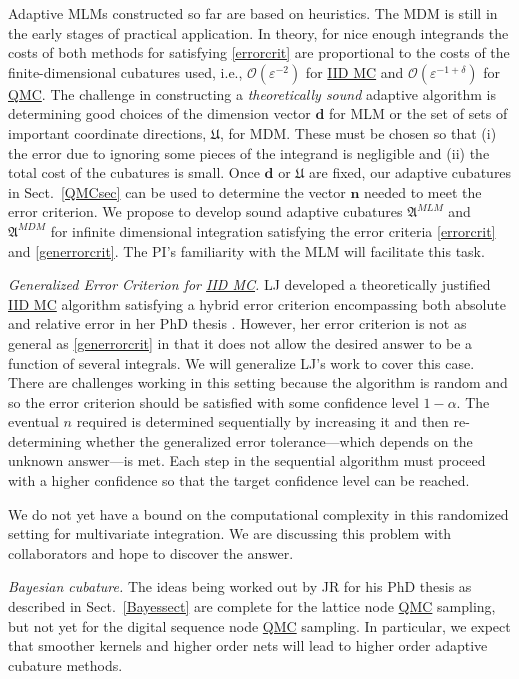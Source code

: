 \documentclass[11pt]{NSFamsart}
\newcommand{\QMC}{\hyperlink{QMClink}{QMC}\xspace}
\newcommand{\IIDMC}{\hyperlink{IIDMClink}{IID MC}\xspace}
\newcommand{\bd}{{\boldsymbol{d}}}
\newcommand{\bn}{{\boldsymbol{n}}}
\newcommand{\fA}{\mathfrak{A}}
\newcommand{\fU}{\mathfrak{U}}
\newcommand{\Order}{\mathcal{O}}
\begin{document}
Adaptive MLMs constructed so far are based on heuristics.  The MDM is still in the early stages of 
practical application.  In theory, for nice enough integrands the costs of both methods for satisfying 
\eqref{errorcrit} are proportional to the costs of the finite-dimensional cubatures used, i.e., 
$\Order(\varepsilon^{-2})$ for \IIDMC and $\Order(\varepsilon^{-1+\delta})$ for \QMC.  The 
challenge 
in constructing a 
\emph{theoretically sound} adaptive algorithm is determining good choices 
of the dimension vector $\bd$ for MLM or the set of sets of important coordinate directions, $\fU$, 
for MDM.
These must be chosen so that (i) the error due to ignoring some pieces of the integrand is negligible 
and (ii) the total cost of the cubatures is small. 
Once  $\bd$ or $\fU$ are fixed, our adaptive cubatures in Sect.\ \ref{QMCsec} can be used to 
determine the vector $\bn$ needed to meet the error criterion.  We propose to develop sound 
adaptive cubatures $\fA^{MLM}$ and $\fA^{MDM}$ for infinite dimensional integration satisfying the 
error criteria \eqref{errorcrit} and 
\eqref{generrorcrit}.  The PI's familiarity with the MLM \cite{HicMGRitNiu09a, NiuHic09a, 
NiuHic09b} will facilitate this task.

\emph{Generalized Error Criterion for \IIDMC.}  LJ developed a theoretically justified \IIDMC 
algorithm satisfying a hybrid error criterion encompassing both absolute and relative error in her PhD 
thesis \cite{Jia16a}.  However, her error criterion is not as general as \eqref{generrorcrit} in that it 
does not allow the desired answer to be a function of several integrals.  We will generalize LJ's work 
to 
cover this case.  There are challenges working in this setting because the algorithm is random and 
so the error criterion should be satisfied with some confidence level $1- \alpha$.  The eventual 
$n$ required is determined sequentially by increasing it and then re-determining whether the 
generalized 
error tolerance---which depends on the unknown answer---is met.  Each step in 
the sequential algorithm must proceed 
with a 
higher confidence so that the target confidence level can be reached.

We  do not yet have a bound on the computational complexity in this randomized setting for 
multivariate integration.  We are discussing this problem with collaborators and hope to discover the 
answer.

\emph{Bayesian cubature.} The ideas being worked out by JR for his PhD thesis as described in 
Sect.\ \ref{Bayessect} are complete for the lattice node \QMC sampling, but not yet for the digital 
sequence node \QMC sampling.  In particular, we expect that smoother kernels and higher order 
nets 
will lead to higher order adaptive cubature methods.
\end{document}
